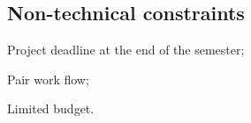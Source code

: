 \subsection{Non-technical constraints}
\label{sec:non-techn-constr}

\begin{item-c}
\item Project deadline at the end of the semester;
\item Pair work flow;
\item Limited budget.
\end{item-c}

%
%  

